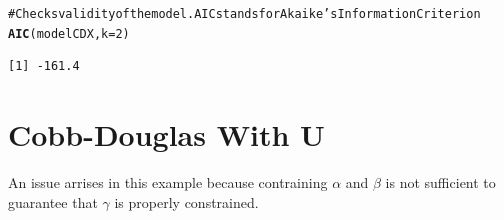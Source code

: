 \documentclass[preprint,authoryear,12pt]{elsarticle}\usepackage{graphicx, color}
\makeatletter
\newcommand{\hlfunctioncall}[1]{\textcolor[rgb]{0.501960784313725,0,0.329411764705882}{\textbf{#1}}}%
\newcommand{\hlcomment}[1]{\textcolor[rgb]{0.180392156862745,0.6,0.341176470588235}{#1}}%
\newenvironment{kframe}{%
 \def\at@end@of@kframe{}%
 \ifinner\ifhmode%
  \def\at@end@of@kframe{\end{minipage}}%
  \begin{minipage}{\columnwidth}%
 \fi\fi%
 \def\FrameCommand##1{\hskip\@totalleftmargin \hskip-\fboxsep
 \colorbox{shadecolor}{##1}\hskip-\fboxsep
     \hskip-\linewidth \hskip-\@totalleftmargin \hskip\columnwidth}%
 \MakeFramed {\advance\hsize-\width
   \@totalleftmargin\z@ \linewidth\hsize
   \@setminipage}}%
 {\par\unskip\endMakeFramed%
 \at@end@of@kframe}
\newenvironment{knitrout}{}{} %
\makeatother
\begin{document}
\begin{knitrout}
\begin{kframe}
\begin{alltt}
\hlcomment{# Checks validity of the model. AIC stands for Akaike's Information Criterion}
\hlfunctioncall{AIC}(modelCDX, k=2)
\end{alltt}
\begin{verbatim}
[1] -161.4
\end{verbatim}
\end{kframe}
\end{knitrout}


\section{Cobb-Douglas With U}

An issue arrises in this example because contraining $\alpha$ and $\beta$ is not sufficient to 
guarantee that $\gamma$ is properly constrained.
\end{document}
